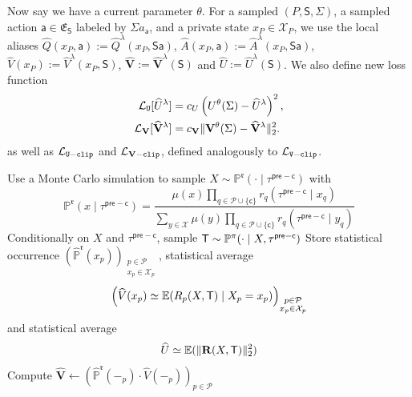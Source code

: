 \documentclass[12pt, a4paper]{article}
\begin{document}
Now say we have a current parameter $\theta$.
For a sampled $(P, \mathsf{S}, \Sigma)$, a sampled action $\mathsf{a}\in\mathfrak{E}_{\mathsf{S}}$ labeled by $\Sigma a_{\mathsf{a}}$, and a private state $x_P \in \mathcal{X}_P$, we use the local aliases $\widehat{Q}(x_P, \mathsf{a}) := \widehat{Q}^\lambda(x_P, \mathsf{S}\mathsf{a})$, $\widehat{A}(x_P, \mathsf{a}) := \widehat{A}^\lambda(x_P, \mathsf{S}\mathsf{a})$, $\widehat{V}(x_P) := \widehat{V}^\lambda(x_P, \mathsf{S})$, $\widehat{\mathbf{V}} := \widehat{\mathbf{V}}^\lambda(\mathsf{S})$ and $\widehat{U} := \widehat{U}^\lambda(\mathsf{S})$.
We also define new loss function
\begin{equation}\label{eq:branched-u-loss}
\begin{aligned}
    \mathcal L_{\tt U}[\widehat{U}^\lambda]
    &= c_U\left(U^\theta(\Sigma) - \widehat{U}^\lambda\right)^2,\\
    \mathcal L_{\mathbf V}[\widehat{\mathbf{V}}^\lambda]
    &= c_{\mathbf V}\|\mathbf{V}^\theta(\Sigma)-\widehat{\mathbf{V}}^\lambda\|_2^2.
\end{aligned}
\end{equation}
as well as $\mathcal L_{\tt U-clip}$ and $\mathcal L_{\mathbf{V}\tt-clip}$, defined analogously to $\mathcal L_{\tt V-clip}$.

\begin{algorithm}[H]
\caption{$(\widehat{\mathbb P}^{\mathfrak r},\widehat V,\widehat{\mathbf V},\widehat U)\gets$~\texttt{PreTerminalMomentMC}$(\mathfrak r,\tau^{\mathsf{pre-c}})$}
\label{alg:mc-preterminal-moments}
\DontPrintSemicolon
{}
  Use a Monte Carlo simulation to sample $X\sim\mathbb P^{\mathfrak r}(\cdot\mid\tau^{\mathsf{pre-c}})$ with
  \[
    \mathbb P^{\mathfrak r}(x\mid\tau^{\mathsf{pre-c}})
    =
    \frac{\mu(x)\prod_{q\in\mathcal P\cup\{\mathsf c\}}r_q(\tau^{\mathsf{pre-c}}\mid x_q)}
         {\sum_{y\in\mathcal X}\mu(y)\prod_{q\in\mathcal P\cup\{\mathsf c\}}r_q(\tau^{\mathsf{pre-c}}\mid y_q)}
  \]\;
  Conditionally on $X$ and $\tau^{\mathsf{pre-c}}$, sample $\mathsf{T}\sim\mathbb P^\pi(\cdot\mid X,\tau^{\mathsf{pre-c}})$\;
  Store statistical occurrence $(\widehat{\mathbb P}^{\mathfrak r}(x_p))_{\substack{p \in \mathcal{P} \\ x_p \in \mathcal{X}_p}}$, statistical average
  \[
    \left(\widehat{V}(x_p) \simeq \mathbb{E}(R_p(X,\mathsf{T}) \mid X_p = x_p)\right)_{\substack{p \in \mathcal{P} \\ x_p \in \mathcal{X}_p}}
  \]
  and statistical average
  \[
    \widehat{U} \simeq \mathbb{E}(\|\mathbf{R}(X,\mathsf{T})\|_2^2)
  \]\;
  Compute $\widehat{\mathbf{V}} \gets \left(\widehat{\mathbb P}^{\mathfrak r}(-_p) \cdot \widehat{V}(-_p)\right)_{p \in \mathcal{P}}$\;
\end{algorithm}
\end{document}
